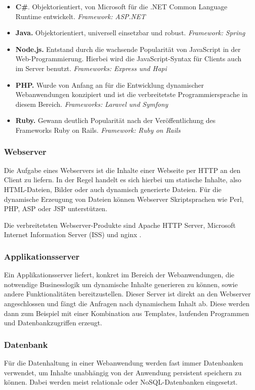 \begin{itemize}
	\item \textbf{C\#}. Objektorientiert, von Microsoft für die .NET Common Language Runtime entwickelt. \textit{Framework: ASP.NET}
	\item \textbf{Java.} Objektorientiert, universell einsetzbar und robust. \textit{Framework: Spring}
	\item \textbf{Node.js.} Entstand durch die wachsende Popularität von JavaScript in der Web-Programmierung. Hierbei wird die JavaScript-Syntax für Clients auch im Server benutzt. \textit{Frameworks: Express und Hapi}
	\item \textbf{PHP.} Wurde von Anfang an für die Entwicklung dynamischer Webanwendungen konzipiert und ist die verbreitetste Programmiersprache in diesem Bereich. \textit{Frameworks: Laravel und Symfony}
	\item \textbf{Ruby.} Gewann deutlich Popularität nach der Veröffentlichung des Frameworks Ruby on Rails. \textit{Framework: Ruby on Rails}
\end{itemize}

\subsubsection{Webserver}
Die Aufgabe eines Webservers ist die Inhalte einer Webseite per \acs{HTTP} an den Client zu liefern. In der Regel handelt es sich hierbei um statische Inhalte, also \acs{HTML}-Dateien, Bilder oder auch dynamisch generierte Dateien. Für die dynamische Erzeugung von Dateien können Webserver Skriptsprachen wie Perl, PHP, ASP oder JSP unterstützen.

Die verbreitetsten Webserver-Produkte sind Apache \acs{HTTP} Server, Microsoft Internet Information Server (\acs{ISS}) und nginx \cite{Rouse2012}.

\subsubsection{Applikationsserver}
Ein Applikationsserver liefert, konkret im Bereich der Webanwendungen, die notwendige Businesslogik um dynamische Inhalte generieren zu können, sowie andere Funktionalitäten bereitzustellen. Dieser Server ist direkt an den Webserver angeschlossen und fängt die Anfragen nach dynamischem Inhalt ab. Diese werden dann zum Beispiel mit einer Kombination aus Templates, laufenden Programmen und Datenbankzugriffen erzeugt. \cite{ITWissen.info2013}

\subsubsection{Datenbank}
Für die Datenhaltung in einer Webanwendung werden fast immer Datenbanken verwendet, um Inhalte unabhängig von der Anwendung persistent speichern zu können.
Dabei werden meist relationale oder \acs{NoSQL}-Datenbanken eingesetzt.

